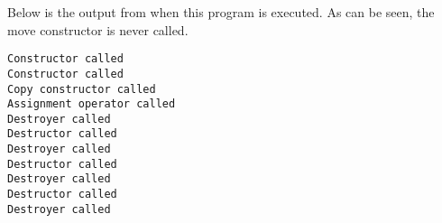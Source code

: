 Below is the output from when this program is executed. As can be seen, the move constructor is never called.

\begin{lstlisting}[style=text]
Constructor called
Constructor called
Copy constructor called
Assignment operator called
Destroyer called
Destructor called
Destroyer called
Destructor called
Destroyer called
Destructor called
Destroyer called
\end{lstlisting}
